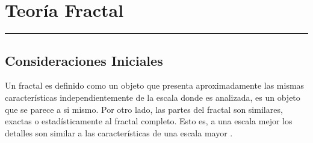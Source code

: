 
\chapter{Teoría Fractal}
\hrule \bigskip \vspace*{1cm}

\section{Consideraciones Iniciales}

Un fractal es definido como un objeto que presenta aproximadamente las mismas características independientemente de la escala donde es analizada, es un objeto que se parece a si mismo. Por otro lado, las partes del fractal son similares, exactas o estadísticamente  al  fractal completo. Esto es, a una escala mejor los detalles son similar a las características de una escala mayor \cite{Schroeder:1991,traina2005using}.
 

